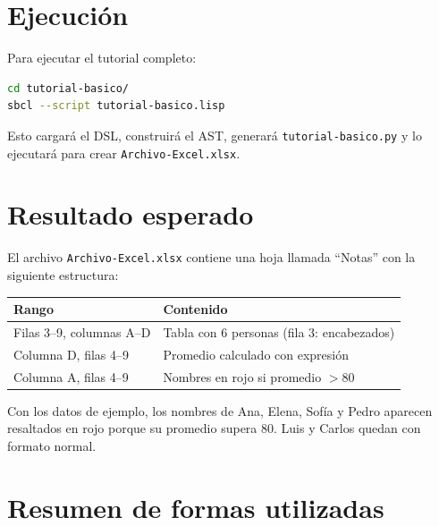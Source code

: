 \documentclass[12pt,a4paper]{report}
\begin{document}
\section{Ejecución}

Para ejecutar el tutorial completo:

\begin{lstlisting}[language=bash, numbers=none, backgroundcolor=\color{gray!10},
                   basicstyle=\ttfamily\small]
cd tutorial-basico/
sbcl --script tutorial-basico.lisp
\end{lstlisting}

Esto cargará el DSL, construirá el AST, generará
\texttt{tutorial-basico.py} y lo ejecutará para crear
\texttt{Archivo-Excel.xlsx}.

\section{Resultado esperado}

El archivo \texttt{Archivo-Excel.xlsx} contiene una hoja llamada
``Notas'' con la siguiente estructura:

\begin{center}
\begin{tabular}{ll}
\toprule
\textbf{Rango} & \textbf{Contenido} \\
\midrule
Filas 3--9, columnas A--D & Tabla con 6 personas (fila 3: encabezados) \\
Columna D, filas 4--9     & Promedio calculado con expresión \\
Columna A, filas 4--9     & Nombres en rojo si promedio $> 80$ \\
\bottomrule
\end{tabular}
\end{center}

Con los datos de ejemplo, los nombres de Ana, Elena, Sofía y Pedro
aparecen resaltados en rojo porque su promedio supera 80.  Luis y Carlos
quedan con formato normal.

\section{Resumen de formas utilizadas}
\end{document}

